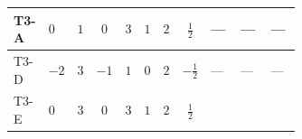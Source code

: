 \documentclass[8pt]{article}
\begin{document}
\begin{landscape}
\begin{longtable}{@{}llcccccc >{\raggedright\arraybackslash}p{0.21\linewidth} >{\raggedright\arraybackslash}p{0.21\linewidth} >{\raggedright\arraybackslash}p{0.21\linewidth}@{}}
\midrule
T3-A & $0$ & $1$ & $0$ & $3$ & $1$ & $2$ & $\frac{1}{2}$ & --- & --- & --- \\
\midrule
T3-D & $-2$ & $3$ & $-1$ & $1$ & $0$ & $2$ & $-\frac{1}{2}$ & --- & --- & --- \\
\midrule
T3-E & $0$ & $3$ & $0$ & $3$ & $1$ & $2$ & $\frac{1}{2}$ & \scriptsize\adjustbox{max width=\linewidth}{$\begin{gathered} +8 {\lambda_{12}} {\lambda_{12}^{\rm Adj}}\end{gathered}$} & \scriptsize\adjustbox{max width=\linewidth}{$\begin{gathered} +2 {\lambda_{12}^{\rm Adj}} {\lambda_{S_1}}\end{gathered}$} & \scriptsize\adjustbox{max width=\linewidth}{$\begin{gathered} +2 {\lambda_{12}^{\rm Adj}} {\lambda_{S_2}}\end{gathered}$} \\
\midrule
\bottomrule
\end{longtable}
\clearpage

\end{landscape}
\end{document}
